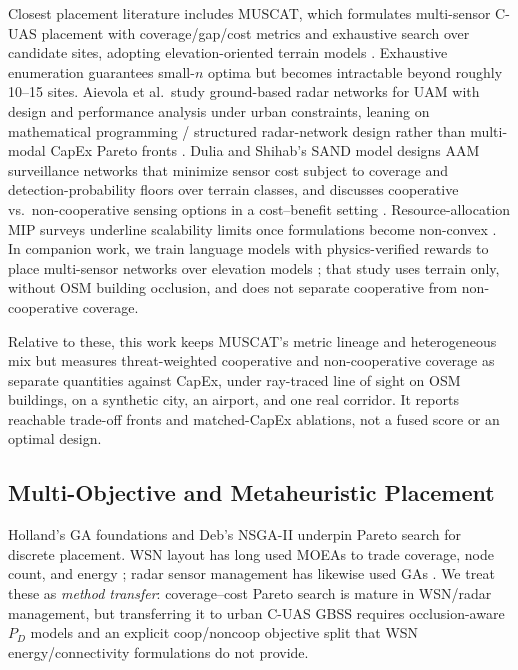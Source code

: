 Closest placement literature includes MUSCAT, which formulates multi-sensor C-UAS placement with coverage/gap/cost metrics and exhaustive search over candidate sites, adopting elevation-oriented terrain models \cite{muscat2023}. Exhaustive enumeration guarantees small-$n$ optima but becomes intractable beyond roughly 10--15 sites. Aievola et al.\ study ground-based radar networks for UAM with design and performance analysis under urban constraints, leaning on mathematical programming / structured radar-network design rather than multi-modal CapEx Pareto fronts \cite{aievola2022ground}. Dulia and Shihab's SAND model designs AAM surveillance networks that minimize sensor cost subject to coverage and detection-probability floors over terrain classes, and discusses cooperative vs.\ non-cooperative sensing options in a cost--benefit setting \cite{dulia2024sand}. Resource-allocation MIP surveys underline scalability limits once formulations become non-convex \cite{katoh1998resource}. In companion work, we train language models with physics-verified rewards to place multi-sensor networks over elevation models \cite{albuquerque2026llmplacement}; that study uses terrain only, without OSM building occlusion, and does not separate cooperative from non-cooperative coverage.

Relative to these, this work keeps MUSCAT's metric lineage and heterogeneous mix but measures threat-weighted cooperative and non-cooperative coverage as separate quantities against CapEx, under ray-traced line of sight on OSM buildings, on a synthetic city, an airport, and one real corridor. It reports reachable trade-off fronts and matched-CapEx ablations, not a fused score or an optimal design.

\subsection{Multi-Objective and Metaheuristic Placement}

Holland's GA foundations \cite{holland1992adaptation} and Deb's NSGA-II \cite{deb2002fast} underpin Pareto search for discrete placement. WSN layout has long used MOEAs to trade coverage, node count, and energy \cite{molina2008layout,iqbal2015wsn,zou2019WSN}; radar sensor management has likewise used GAs \cite{charlish2016radar}. We treat these as \emph{method transfer}: coverage--cost Pareto search is mature in WSN/radar management, but transferring it to urban C-UAS GBSS requires occlusion-aware $P_D$ models and an explicit coop/noncoop objective split that WSN energy/connectivity formulations do not provide.

